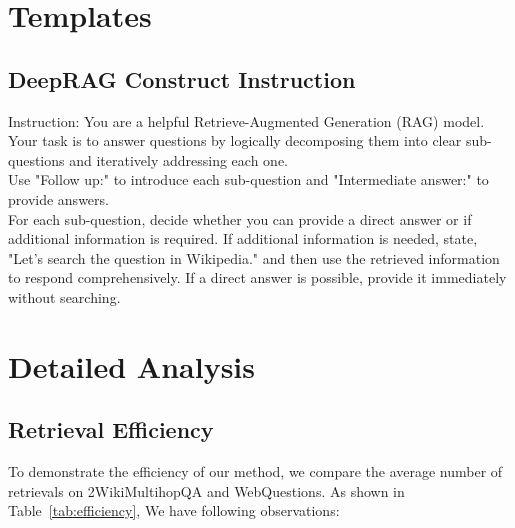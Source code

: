 
\appendix
\section{Templates}
\subsection{DeepRAG Construct Instruction}
\label{template}
\begin{tcolorbox}
\small

Instruction: You are a helpful Retrieve-Augmented Generation (RAG) model. Your task is to answer questions by logically decomposing them into clear sub-questions and iteratively addressing each one. \\

Use "Follow up:" to introduce each sub-question and "Intermediate answer:" to provide answers. \\

For each sub-question, decide whether you can provide a direct answer or if additional information is required. If additional information is needed, state, "Let's search the question in Wikipedia." and then use the retrieved information to respond comprehensively. If a direct answer is possible, provide it immediately without searching.


\end{tcolorbox}




\section{Detailed Analysis}
\subsection{Retrieval Efficiency}

To demonstrate the efficiency of our method, we compare the average number of retrievals on 2WikiMultihopQA and WebQuestions. As shown in Table~\ref{tab:efficiency}, We have following observations:

